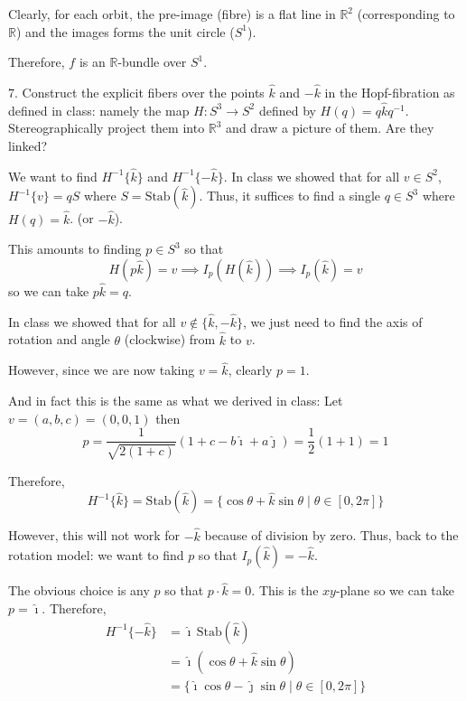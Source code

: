 \documentclass[12pt]{article}
\newcommand{\R}{\mathbb{R}}
\newcommand{\lra}{\longrightarrow}
\newcommand{\ihat}{\hat{\imath}}
\newcommand{\jhat}{\hat{\jmath}}
\newcommand{\khat}{\hat{k}}
\begin{document}
        Clearly, for each orbit, the pre-image (fibre) is a flat line in $\R^2$ (corresponding to $\R$) and the images forms the unit circle ($S^1$). 

        Therefore, $f$ is an $\R$-bundle over $S^1$.
    \color{black}

\pagebreak 

7.  Construct the explicit fibers over the points $\hat{k}$ and $-\hat{k}$ in the Hopf-fibration as defined in class: namely the map $H : S^{3} \lra S^{2}$ defined by $H(q) = q\hat{k}q^{-1}$.  Stereographically project them into $\R^{3}$ and draw a picture of them.  Are they linked?

    \color{blue}
        We want to find $H^{-1}\{\khat\}$ and $H^{-1}\{-\khat\}$. In class we showed that for all $v \in S^2$, $H^{-1}\{v\} = qS$ where $S = \text{Stab}(\khat)$. Thus, it suffices to find a single $q \in S^3$ where $H(q) = \khat$. (or $-\khat$). 

        This amounts to finding $p \in S^3$ so that 
        \[H(p\khat) = v \implies I_p(H(\khat)) \implies I_p(\khat) = v\]
        so we can take $p\khat = q$. 

        In class we showed that for all $v \notin \{\khat, -\khat\}$, we just need to find the axis of rotation and angle $\theta$ (clockwise) from $\khat$ to $v$. 

        However, since we are now taking $v = \khat$, clearly $p = 1$. 

        And in fact this is the same as what we derived in class: Let $v = (a, b, c) = (0, 0, 1)$ then
        \[p = \frac{1}{\sqrt{2(1 + c)}}(1 + c - b\ihat + a\jhat) = \frac{1}{2}(1 + 1) = 1\]

        Therefore,
        \[\boxed{H^{-1}\{\khat\} = \text{Stab}(\khat) = \{\cos \theta + \khat \sin \theta \; | \; \theta\in [0, 2\pi]\}}\]

        However, this will not work for $-\khat$ because of division by zero. Thus, back to the rotation model: we want to find $p$ so that $I_p(\khat) = -\khat$.

        The obvious choice is any $p$ so that $p \cdot \khat = 0$. This is the $xy$-plane so we can take $p = \ihat$. Therefore, 
        \begin{align*}
            H^{-1}\{-\khat\} &= \ihat \, \text{Stab}(\khat)\\ 
                &= \ihat (\cos \theta + \khat \sin \theta)\\ 
                &= \boxed{\{\ihat \cos \theta - \jhat \sin \theta \; | \; \theta \in [0, 2\pi]\}}
        \end{align*}
\end{document}

